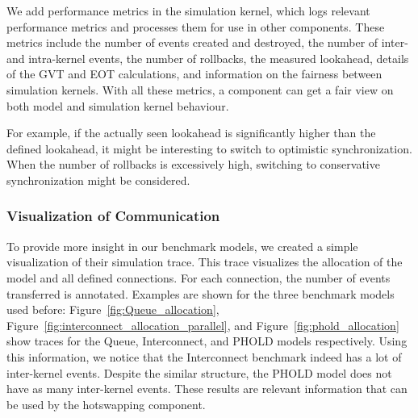 We add performance metrics in the simulation kernel, which logs relevant performance metrics and processes them for use in other components.
These metrics include the number of events created and destroyed, the number of inter- and intra-kernel events, the number of rollbacks, the measured lookahead, details of the GVT and EOT calculations, and information on the fairness between simulation kernels.
With all these metrics, a component can get a fair view on both model and simulation kernel behaviour.

For example, if the actually seen lookahead is significantly higher than the defined lookahead, it might be interesting to switch to optimistic synchronization.
When the number of rollbacks is excessively high, switching to conservative synchronization might be considered.

\subsubsection{Visualization of Communication}
To provide more insight in our benchmark models, we created a simple visualization of their simulation trace.
This trace visualizes the allocation of the model and all defined connections.
For each connection, the number of events transferred is annotated.
Examples are shown for the three benchmark models used before: Figure~\ref{fig:Queue_allocation}, Figure~\ref{fig:interconnect_allocation_parallel}, and Figure~\ref{fig:phold_allocation} show traces for the Queue, Interconnect, and PHOLD models respectively.
Using this information, we notice that the Interconnect benchmark indeed has a lot of inter-kernel events.
Despite the similar structure, the PHOLD model does not have as many inter-kernel events.
These results are relevant information that can be used by the hotswapping component.

